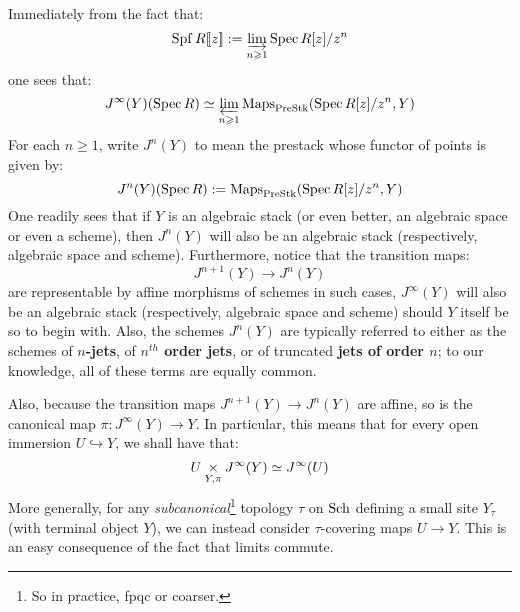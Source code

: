         \begin{remark} \label{remark: representability_of_jet_spaces}
            Immediately from the fact that:
                $$\operatorname{Spf} R[\![z]\!] := \varinjlim_{n \geqslant 1} \operatorname{Spec} R[z]/z^n$$
            one sees that:
                $$J^{\infty}(Y)(\operatorname{Spec} R) \simeq \varprojlim_{n \geqslant 1} \operatorname{Maps}_{\mathrm{Pre}\mathrm{Stk}}(\operatorname{Spec} R[z]/z^n, Y)$$
            For each $n \geq 1$, write $J^n(Y)$ to mean the prestack whose functor of points is given by:
                $$J^n(Y)(\operatorname{Spec} R) := \operatorname{Maps}_{\mathrm{Pre}\mathrm{Stk}}(\operatorname{Spec} R[z]/z^n, Y)$$
            One readily sees that if $Y$ is an algebraic stack (or even better, an algebraic space or even a scheme), then $J^n(Y)$ will also be an algebraic stack (respectively, algebraic space and scheme). Furthermore, notice that the transition maps:
                $$J^{n + 1}(Y) \to J^n(Y)$$
            are representable by affine morphisms of schemes in such cases, $J^{\infty}(Y)$ will also be an algebraic stack (respectively, algebraic space and scheme) should $Y$ itself be so to begin with. Also, the schemes $J^n(Y)$ are typically referred to either as the schemes of \textbf{$n$-jets}, of \textbf{$n^{th}$ order jets}, or of truncated \textbf{jets of order $n$}; to our knowledge, all of these terms are equally common.
    
            Also, because the transition maps $J^{n + 1}(Y) \to J^n(Y)$ are affine, so is the canonical map $\pi: J^{\infty}(Y) \to Y$. In particular, this means that for every open immersion $U \hookrightarrow Y$, we shall have that:
                $$U \x_{Y, \pi} J^{\infty}(Y) \cong J^{\infty}(U)$$
            More generally, for any \textit{subcanonical}\footnote{So in practice, fpqc or coarser.} topology $\tau$ on $\mathrm{Sch}$ defining a small site $Y_{\tau}$ (with terminal object $Y$), we can instead consider $\tau$-covering maps $U \to Y$. This is an easy consequence of the fact that limits commute. 
        \end{remark}
        
